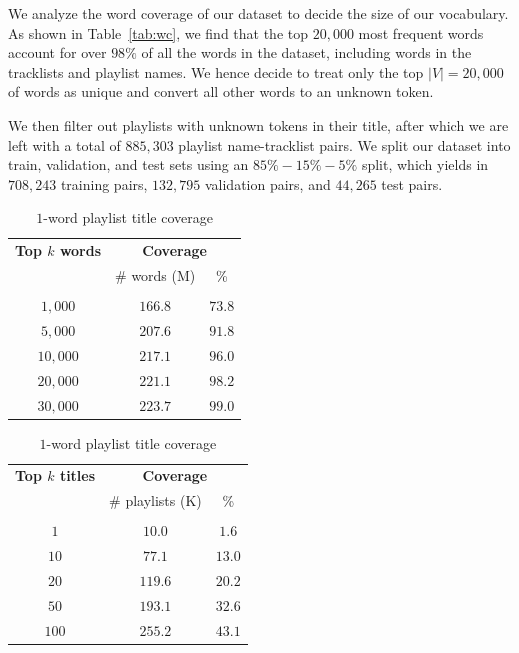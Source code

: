 \documentclass{article} %
\begin{document}
We analyze the word coverage of our dataset to decide the size of our vocabulary. 
As shown in Table~\ref{tab:wc}, we find that the top $20,000$ most frequent words account for over $98\%$ of all the words in the dataset, including words in the tracklists and playlist names. 
We hence decide to treat only the top $|V| = 20,000$ of words as unique and convert all other words to an unknown token.

We then filter out playlists with unknown tokens in their title, after which we are left with a total of $885,303$ playlist name-tracklist pairs. 
We split our dataset into train, validation, and test sets using an $85\%-15\%-5\%$ split, which yields in $708,243$ training pairs, $132,795$ validation pairs, and $44,265$ test pairs.

\begin{table}[!h]
\begin{minipage}[b]{0.5\linewidth}
\centering
    \begin{tabular}{ccc}
    \multicolumn{1}{c}{\bf Top $k$ words}  &\multicolumn{2}{c}{\bf Coverage}\\
                                           & \# words (M) & \% 
    \\ \hline \\
    $1,000$ & $166.8$ & $73.8$\\
    $5,000$ & $207.6$ & $91.8$\\
    $10,000$ & $217.1$ & $96.0$\\
    $20,000$ & $221.1$ & $98.2$\\
    $30,000$ & $223.7$ & $99.0$\\
    \end{tabular}
    \caption{Word coverage}
    \label{tab:wc}
\end{minipage}\hfill
\begin{minipage}[b]{0.5\linewidth}
\centering
    \begin{tabular}{ccc}
    \multicolumn{1}{c}{\bf Top $k$ titles}  &\multicolumn{2}{c}{\bf Coverage}\\
                                            & \# playlists (K) & \% 
    \\ \hline \\
    $1$ & $10.0$ & $1.6$\\
    $10$ & $77.1$ & $13.0$\\
    $20$ & $119.6$ & $20.2$\\
    $50$ & $193.1$ & $32.6$\\
    $100$ & $255.2$ & $43.1$\\
    \end{tabular}
    \caption{$1$-word playlist title coverage}
    \label{tab:tc}
\end{minipage}
\end{table}
\end{document}
